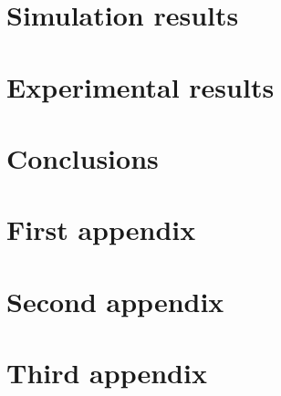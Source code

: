 \documentclass[a4paper,twoside,12pt]{book}
\begin{document}
\chapter{Simulation results\label{chap:simulation_results}}


\chapter{Experimental results\label{chap:experimental_results}}


\chapter*{Conclusions}





\appendix
\chapter{First appendix\label{app:first-appendix}}


\chapter{Second appendix\label{app:second-appendix}}


\chapter{Third appendix\label{app:third-appendix}}

\cleardoublepage{}

\end{document}
